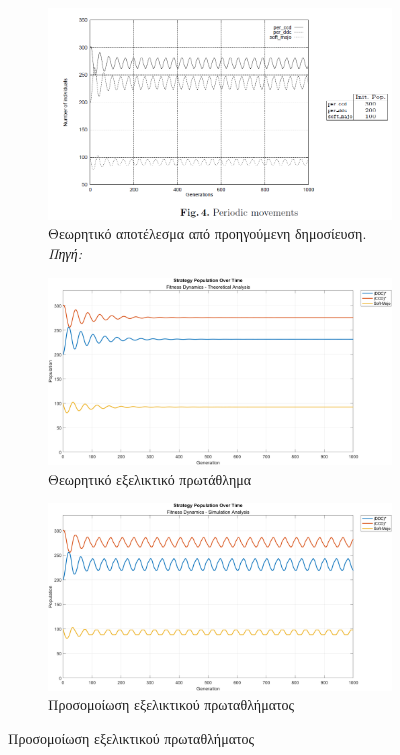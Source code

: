 \documentclass[12pt]{report}
\begin{document}
\begin{figure}[htbp]
    \centering

    \begin{subfigure}[b]{0.5\linewidth}
        \centering
        \includegraphics[width=\linewidth]{Figures Fitness Dynamics/4.png}
        \caption{Θεωρητικό αποτέλεσμα από προηγούμενη δημοσίευση. \textit{Πηγή:} \protect\cite{mathieu1999}}
        \label{fig:fig_fit_4_a}
    \end{subfigure}
    \hfill
    \begin{subfigure}[b]{0.5\linewidth}
        \centering
        \includegraphics[width=\linewidth]{Figures Fitness Dynamics/example4.png}
        \caption{Θεωρητικό εξελικτικό πρωτάθλημα}
        \label{fig:fig_fit_4_b}
    \end{subfigure}
    \hfill
    \begin{subfigure}[b]{0.5\linewidth}
        \centering
        \includegraphics[width=\linewidth]{Figures Fitness Dynamics/example4-sim.png}
        \caption{Προσομοίωση εξελικτικού πρωταθλήματος}
        \label{fig:fig_fit_4_c}
    \end{subfigure}


\end{figure}
\end{document}

